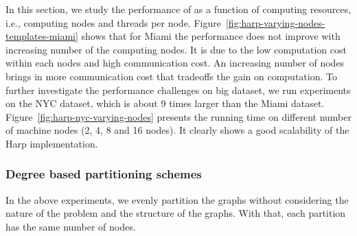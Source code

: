 In this section, we study the performance of \harpsahad{} as a function
of computing resources, i.e., computing nodes and threads per node.
Figure~\ref{fig:harp-varying-nodes-templates-miami} shows that for Miami the
performance does not improve with increasing number of the computing nodes. It
is due to the low computation cost within each nodes and high communication
cost. An increasing number of nodes brings in more communication cost that
tradeoffs the gain on computation. To further investigate the performance
challenges on big dataset, we run experiments on the NYC dataset, which is about
9 times larger than the Miami dataset. Figure~\ref{fig:harp-nyc-varying-nodes}
presents the running time on different number of machine nodes (2, 4, 8 and 16
nodes). It clearly shows a good scalability of the Harp implementation.  

\subsubsection{Degree based partitioning schemes}
In the above experiments, we evenly partition the graphs without considering the
nature of the problem and the structure of the graphs. With that, each partition
has the same number of nodes. 

